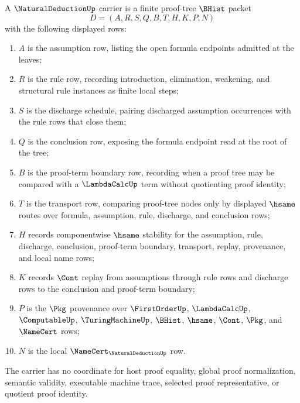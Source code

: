 \begin{definition}
\label{def:natural-deduction-carrier}
A $\NaturalDeductionUp$ carrier is a finite proof-tree $\BHist$ packet
$$
D=(A,R,S,Q,B,T,H,K,P,N)
$$
with the following displayed rows:
\begin{enumerate}
\item $A$ is the assumption row, listing the open formula endpoints admitted at the leaves;
\item $R$ is the rule row, recording introduction, elimination, weakening, and structural rule instances as finite local steps;
\item $S$ is the discharge schedule, pairing discharged assumption occurrences with the rule rows that close them;
\item $Q$ is the conclusion row, exposing the formula endpoint read at the root of the tree;
\item $B$ is the proof-term boundary row, recording when a proof tree may be compared with a $\LambdaCalcUp$ term without quotienting proof identity;
\item $T$ is the transport row, comparing proof-tree nodes only by displayed $\hsame$ routes over formula, assumption, rule, discharge, and conclusion rows;
\item $H$ records componentwise $\hsame$ stability for the assumption, rule, discharge, conclusion, proof-term boundary, transport, replay, provenance, and local name rows;
\item $K$ records $\Cont$ replay from assumptions through rule rows and discharge rows to the conclusion and proof-term boundary;
\item $P$ is the $\Pkg$ provenance over $\FirstOrderUp$, $\LambdaCalcUp$, $\ComputableUp$, $\TuringMachineUp$, $\BHist$, $\hsame$, $\Cont$, $\Pkg$, and $\NameCert$ rows;
\item $N$ is the local $\NameCert_{\NaturalDeductionUp}$ row.
\end{enumerate}
The carrier has no coordinate for host proof equality, global proof normalization, semantic validity, executable machine trace, selected proof representative, or quotient proof identity.
\end{definition}

